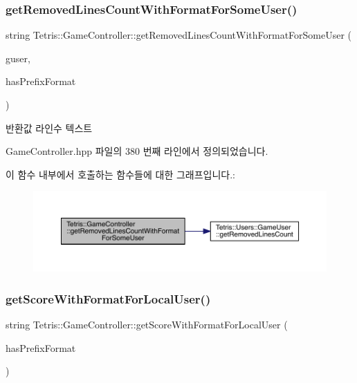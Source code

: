 \subsubsection{\texorpdfstring{get\+Removed\+Lines\+Count\+With\+Format\+For\+Some\+User()}{getRemovedLinesCountWithFormatForSomeUser()}}
{\footnotesize\ttfamily string Tetris\+::\+Game\+Controller\+::get\+Removed\+Lines\+Count\+With\+Format\+For\+Some\+User (\begin{DoxyParamCaption}\item[{\hyperlink{class_tetris_1_1_users_1_1_game_user}{Game\+User} $\ast$}]{guser,  }\item[{bool}]{has\+Prefix\+Format }\end{DoxyParamCaption})\hspace{0.3cm}{\ttfamily [inline]}}

\begin{DoxyReturn}{반환값}
라인수 텍스트 
\end{DoxyReturn}


Game\+Controller.\+hpp 파일의 380 번째 라인에서 정의되었습니다.

이 함수 내부에서 호출하는 함수들에 대한 그래프입니다.\+:
\nopagebreak
\begin{figure}[H]
\begin{center}
\leavevmode
\includegraphics[width=350pt]{class_tetris_1_1_game_controller_a2e7275bdb8f29ce4f1dfec790c22705d_cgraph}
\end{center}
\end{figure}
\mbox{\label{class_tetris_1_1_game_controller_a84270bd9c52aae8ba1434d96a96b6c3c}} 
\subsubsection{\texorpdfstring{get\+Score\+With\+Format\+For\+Local\+User()}{getScoreWithFormatForLocalUser()}}
{\footnotesize\ttfamily string Tetris\+::\+Game\+Controller\+::get\+Score\+With\+Format\+For\+Local\+User (\begin{DoxyParamCaption}\item[{bool}]{has\+Prefix\+Format }\end{DoxyParamCaption})\hspace{0.3cm}{\ttfamily [inline]}}



